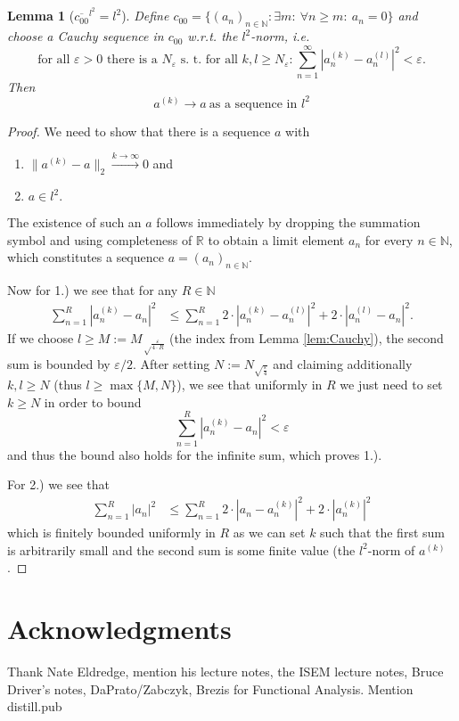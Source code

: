\documentclass{scrartcl}
\newtheorem{lemma}{Lemma}
\theoremstyle{definition}
\theoremstyle{remark}
\newcommand{\eps}{\varepsilon}
\newcommand{\N}{\mathbb N}
\newcommand{\R}{\mathbb R}
\begin{document}
\begin{lemma}[$\overline{c_{00}}^{l^2} = l^2$]\label{lem:c00l2}
Define $c_{00} = \{(a_n)_{n\in\N}: \exists m:~ \forall n\geq m:~ a_n = 0\}$ and choose a Cauchy sequence in $c_{00}$ w.r.t. the $l^2$-norm, i.e.
\[\text{for all } \eps > 0 \text{ there is a } N_\eps \text{ s. t. for all } k,l\geq N_\eps: \sum_{n=1}^\infty |a_n^{(k)} - a_n^{(l)}|^2 < \eps.\]
Then \[a^{(k)} \to a ~ \text{as a sequence in $l^2$}\]
\end{lemma}
\begin{proof}
We need to show that there is a sequence $a$ with
\begin{enumerate}
\item $\|a^{(k)} - a\|_2 \xrightarrow{k\to\infty} 0$ and
\item $a \in l^2.$
\end{enumerate}
The existence of such an $a$ follows immediately by dropping the summation symbol and using completeness of $\R$ to obtain a limit element $a_n$ for every $n\in \N$, which constitutes a sequence $a = (a_n)_{n\in\N}$.

Now for 1.) we see that for any $R\in\N$
\begin{align*}
\sum_{n=1}^R |a_n^{(k)}-a_n|^2 &\leq  \sum_{n=1}^R 2\cdot |a_n^{(k)}-a_n^{(l)}|^2 + 2\cdot |a_n^{(l)}-a_n|^2.
\end{align*}
If we choose $l \geq M := M_{\sqrt\frac{\eps}{4\cdot R}}$ (the index from Lemma \ref{lem:Cauchy}), the second sum is bounded by $\eps/2$. After setting $N := N_{\sqrt{\frac{\eps}{4}}}$ and claiming additionally $k,l\geq N$ (thus $l\geq\max\{M,N\}$), we see that uniformly in $R$ we just need to set $k \geq N$ in order to bound 
\[\sum_{n=1}^R |a_n^{(k)}-a_n|^2  < \eps \]
and thus the bound also holds for the infinite sum, which proves 1.).

For 2.) we see that 
\begin{align*}
\sum_{n=1}^R |a_n|^2 &\leq \sum_{n=1}^R 2 \cdot|a_n-a_n^{(k)}|^2 + 2\cdot | a_n^{(k)}|^2
\end{align*}
which is finitely bounded uniformly in $R$ as we can set $k$ such that the first sum is arbitrarily small and the second sum is some finite value (the $l^2$-norm of $a^{(k)}$.
\end{proof}
\section{Acknowledgments}
Thank Nate Eldredge, mention his lecture notes, the ISEM lecture notes, Bruce Driver's notes, DaPrato/Zabczyk, Brezis for Functional Analysis. Mention distill.pub


\end{document}
